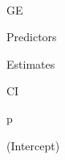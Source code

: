 \documentclass[
  letterpaper,
  DIV=11,
  numbers=noendperiod]{scrartcl}
\begin{document}
\begin{table}

\caption{\textbf{?(caption)}}\begin{minipage}[t]{\linewidth}

{\centering 

~

}

\end{minipage}%
\newline
\begin{minipage}[t]{\linewidth}

{\centering 

GE

}

\end{minipage}%
\newline
\begin{minipage}[t]{\linewidth}

{\centering 

Predictors

}

\end{minipage}%
\newline
\begin{minipage}[t]{\linewidth}

{\centering 

Estimates

}

\end{minipage}%
\newline
\begin{minipage}[t]{\linewidth}

{\centering 

CI

}

\end{minipage}%
\newline
\begin{minipage}[t]{\linewidth}

{\centering 

p

}

\end{minipage}%
\newline
\begin{minipage}[t]{\linewidth}

{\centering 

(Intercept)

}

\end{minipage}%
\newline
\begin{minipage}[t]{\linewidth}


\end{minipage}
\end{table}
\end{document}
